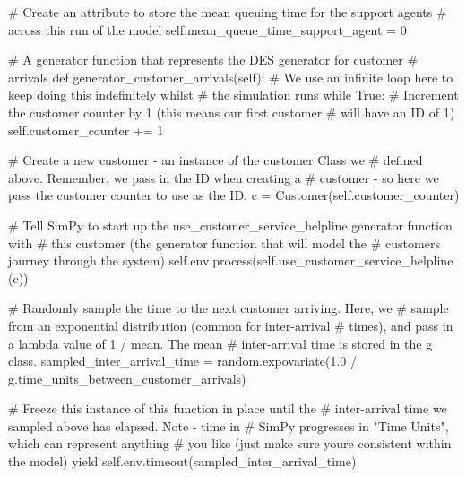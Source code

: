 \documentclass[
  letterpaper,
  DIV=11,
  numbers=noendperiod]{scrreprt}
\newenvironment{Shaded}{\begin{snugshade}}{\end{snugshade}}
\newcommand{\CommentTok}[1]{\textcolor[rgb]{0.37,0.37,0.37}{#1}}
\newcommand{\ControlFlowTok}[1]{\textcolor[rgb]{0.00,0.23,0.31}{#1}}
\newcommand{\DecValTok}[1]{\textcolor[rgb]{0.68,0.00,0.00}{#1}}
\newcommand{\FloatTok}[1]{\textcolor[rgb]{0.68,0.00,0.00}{#1}}
\newcommand{\KeywordTok}[1]{\textcolor[rgb]{0.00,0.23,0.31}{#1}}
\newcommand{\NormalTok}[1]{\textcolor[rgb]{0.00,0.23,0.31}{#1}}
\newcommand{\OperatorTok}[1]{\textcolor[rgb]{0.37,0.37,0.37}{#1}}
\newcommand{\VariableTok}[1]{\textcolor[rgb]{0.07,0.07,0.07}{#1}}
\begin{document}
\begin{tcolorbox}
\begin{Shaded}
\begin{Highlighting}[]
        \CommentTok{\# Create an attribute to store the mean queuing time for the support agents}
        \CommentTok{\# across this run of the model}
        \VariableTok{self}\NormalTok{.mean\_queue\_time\_support\_agent }\OperatorTok{=} \DecValTok{0}

    \CommentTok{\# A generator function that represents the DES generator for customer}
    \CommentTok{\# arrivals}
    \KeywordTok{def}\NormalTok{ generator\_customer\_arrivals(}\VariableTok{self}\NormalTok{):}
        \CommentTok{\# We use an infinite loop here to keep doing this indefinitely whilst}
        \CommentTok{\# the simulation runs}
        \ControlFlowTok{while} \VariableTok{True}\NormalTok{:}
            \CommentTok{\# Increment the customer counter by 1 (this means our first customer}
            \CommentTok{\# will have an ID of 1)}
            \VariableTok{self}\NormalTok{.customer\_counter }\OperatorTok{+=} \DecValTok{1}

            \CommentTok{\# Create a new customer {-} an instance of the customer Class we}
            \CommentTok{\# defined above.  Remember, we pass in the ID when creating a}
            \CommentTok{\# customer {-} so here we pass the customer counter to use as the ID.}
\NormalTok{            c }\OperatorTok{=}\NormalTok{ Customer(}\VariableTok{self}\NormalTok{.customer\_counter)}

            \CommentTok{\# Tell SimPy to start up the use\_customer\_service\_helpline generator function with}
            \CommentTok{\# this customer (the generator function that will model the}
            \CommentTok{\# customer\textquotesingle{}s journey through the system)}
            \VariableTok{self}\NormalTok{.env.process(}\VariableTok{self}\NormalTok{.use\_customer\_service\_helpline (c))}

            \CommentTok{\# Randomly sample the time to the next customer arriving.  Here, we}
            \CommentTok{\# sample from an exponential distribution (common for inter{-}arrival}
            \CommentTok{\# times), and pass in a lambda value of 1 / mean.  The mean}
            \CommentTok{\# inter{-}arrival time is stored in the g class.}
\NormalTok{            sampled\_inter\_arrival\_time }\OperatorTok{=}\NormalTok{ random.expovariate(}\FloatTok{1.0} \OperatorTok{/}\NormalTok{ g.time\_units\_between\_customer\_arrivals)}

            \CommentTok{\# Freeze this instance of this function in place until the}
            \CommentTok{\# inter{-}arrival time we sampled above has elapsed.  Note {-} time in}
            \CommentTok{\# SimPy progresses in "Time Units", which can represent anything}
            \CommentTok{\# you like (just make sure you\textquotesingle{}re consistent within the model)}
            \ControlFlowTok{yield} \VariableTok{self}\NormalTok{.env.timeout(sampled\_inter\_arrival\_time)}


\end{Highlighting}
\end{Shaded}
\end{tcolorbox}
\end{document}
